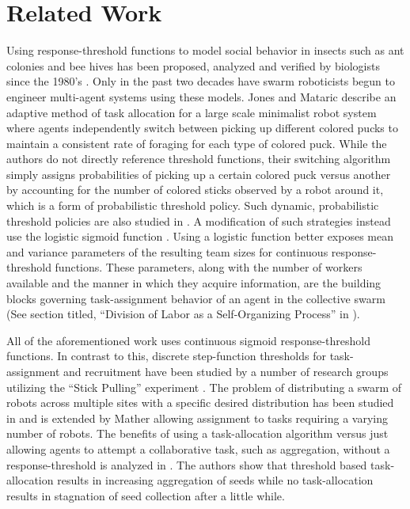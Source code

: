 \documentclass[conference]{ieeeconf}
\begin{document}
\section{Related Work}\label{subsec:rw}
Using response-threshold functions to model social behavior in insects such as ant colonies \cite{Bonabeau1996, Bonabeau1997} and bee hives \cite{Robinson1987, Robinson1992, PageJr1990} has been proposed, analyzed and verified by biologists since the 1980's \cite{Theraulaz1998}. Only in the past two decades have swarm roboticists begun to engineer multi-agent systems using these models. Jones and Mataric \cite{Jones2004} describe an adaptive method of task allocation for a large scale minimalist robot system where agents independently switch between picking up different colored pucks to maintain a consistent rate of foraging for each type of colored puck. While the authors do not directly reference threshold functions, their switching algorithm simply assigns probabilities of picking up a certain colored puck versus another by accounting for the number of colored sticks observed by a robot around it, which is a form of probabilistic threshold policy. Such dynamic, probabilistic threshold policies are also studied in \cite{Nouyan2002}. A modification of such strategies instead use the logistic sigmoid function \cite{Kanakia2014}. Using a logistic function better exposes mean and variance parameters of the resulting team sizes for continuous response-threshold functions. These parameters, along with the number of workers available and the manner in which they acquire information, are the building blocks governing task-assignment behavior of an agent in the collective swarm (See section titled, ``Division of Labor as a Self-Organizing Process'' in \cite{Robinson1992}). 

All of the aforementioned work uses continuous sigmoid response-threshold functions. In contrast to this, discrete step-function thresholds for task-assignment and recruitment have been studied by a number of research groups utilizing the ``Stick Pulling'' experiment \cite{Martinoli1995, Martinoli1998, Lerman2001, Martinoli2004}. The problem of distributing a swarm of robots across multiple sites with a specific desired distribution has been studied in \cite{Berman2009, Correll2008} and is extended by Mather \cite{Mather2010} allowing assignment to tasks requiring a varying number of robots. The benefits of using a task-allocation algorithm versus just allowing agents to attempt a collaborative task, such as aggregation, without a response-threshold is analyzed in \cite{Agassounon2001}. The authors show that threshold based task-allocation results in increasing aggregation of seeds while no task-allocation results in stagnation of seed collection after a little while. 
\end{document}
